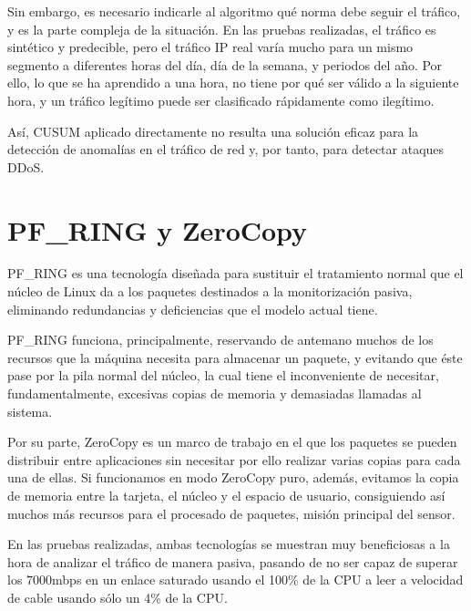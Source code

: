 Sin embargo, es necesario indicarle al algoritmo qué norma debe seguir el tráfico, y es la parte compleja de la 
situación. En las pruebas realizadas, el tráfico es sintético y predecible, pero el tráfico IP real varía mucho para un 
mismo segmento a diferentes horas del día, día de la semana, y periodos del año. Por ello, lo que se ha aprendido a una 
hora, no tiene por qué ser válido a la siguiente hora, y un tráfico legítimo puede ser clasificado rápidamente como 
ilegítimo. 

Así, CUSUM aplicado directamente no resulta una solución eficaz para la detección de anomalías en el tráfico de red y, 
por tanto, para detectar ataques \gls{DDoS}.

\section{PF\_RING y ZeroCopy}
PF\_RING es una tecnología diseñada para sustituir el tratamiento normal que el núcleo de Linux da a los paquetes 
destinados a la monitorización pasiva, eliminando redundancias y deficiencias que el modelo actual tiene. 

PF\_RING funciona, principalmente, reservando de antemano muchos de los recursos que la máquina necesita para almacenar 
un paquete, y evitando que éste pase por la pila normal del núcleo, la cual tiene el inconveniente de necesitar, 
fundamentalmente, excesivas copias de memoria y demasiadas llamadas al sistema.

Por su parte, ZeroCopy es un marco de trabajo en el que los paquetes se pueden distribuir entre aplicaciones sin 
necesitar por ello realizar varias copias para cada una de ellas. Si funcionamos en modo ZeroCopy puro, además, 
evitamos la copia de memoria entre la tarjeta, el núcleo y el espacio de usuario, consiguiendo así muchos más recursos 
para el procesado de paquetes, misión principal del sensor.

En las pruebas realizadas, ambas tecnologías se muestran muy beneficiosas a la hora de analizar el tráfico de manera 
pasiva, pasando de no ser capaz de superar los 7000mbps en un enlace saturado usando el 100\% de la CPU a leer a 
velocidad de cable usando sólo un 4\% de la CPU.

\endinput


